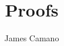 \documentclass[10pt,a4paper,fleqn]{book}
\author{James Camano}
\title{Proofs}
\newcommand{\incltex}[1]{}
\begin{document}
	\maketitle
	\tableofcontents
	\incltex{introduction}
	\incltex{preliminaries}
	\incltex{direct}
	\incltex{indirect}
	\incltex{induction}
	\incltex{appendix}
	\incltex{questions}
\end{document}
